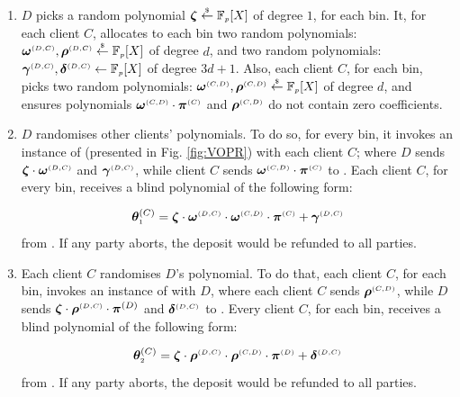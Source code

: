 \begin{enumerate}
\item\label{JUS::check-non-zero-coeff}  $D$ picks a  random polynomial $\bm\zeta \stackrel{\scriptscriptstyle\$}\leftarrow \mathbb{F}_{\scriptscriptstyle p}[X]$ of degree $1$, for each bin.  
It, for each client $C$, allocates to each bin two random polynomials: $\bm\omega^{\scriptscriptstyle(D,C)}, \bm\rho^{\scriptscriptstyle (D,C)}\stackrel{\scriptscriptstyle\$}\leftarrow \mathbb{F}_{\scriptscriptstyle p}[X]$ of degree $d$, and  two  random polynomials: $\bm\gamma^{\scriptscriptstyle (D,C)}, \bm\delta^{\scriptscriptstyle (D,C)} \leftarrow \mathbb{F}_{\scriptscriptstyle p}[X]$ of degree $3d+1$. Also, each client $C$, for each bin, picks two  random polynomials: $\bm\omega^{\scriptscriptstyle (C,D)}, \bm\rho^{\scriptscriptstyle (C,D)}\stackrel{\scriptscriptstyle\$}\leftarrow \mathbb{F}_{\scriptscriptstyle p}[X]$ of degree $d$, and ensures polynomials $\bm\omega^{\scriptscriptstyle (C,D)}\cdot \bm\pi^{\scriptscriptstyle  {  {(C)}}}$ and  $\bm\rho^{\scriptscriptstyle (C,D)}$ do not contain zero coefficients. %




\item\label{e-psi::D-randomises}  $D$ randomises other clients' polynomials. To do so, for every bin, it invokes an instance of {\vopr} (presented in Fig. \ref{fig:VOPR}) with  each client $  C$; where  $D$ sends $\bm\zeta \cdot \bm\omega^{\scriptscriptstyle  {  {(D,C)}}}$ and $\bm\gamma^{\scriptscriptstyle  {  {(D,C)}}}$, while client $ C$ sends $\bm\omega^{\scriptscriptstyle  {  {(C,D)}}}\cdot \bm\pi^{\scriptscriptstyle  {  {(C)}}}$ to {\vopr}. Each client $C$, for every bin, receives a blind polynomial of the following form: 

$$\bm\theta^{  {  {(C)}}}_{\scriptscriptstyle 1}=\bm\zeta \cdot \bm\omega^{\scriptscriptstyle  {  {(D,C)}}}\cdot \bm\omega^{\scriptscriptstyle  {  {(C,D)}}}\cdot \bm\pi^{\scriptscriptstyle  {  {(C)}}}+\bm\gamma^{\scriptscriptstyle  {  {(D,C)}}}$$
%
 from {\vopr}. If any party aborts, the deposit would be refunded to all parties.

\item\label{e-psi::C-randomises} Each client $    {  C}$ randomises  $ {D}$'s polynomial. To do that, each client $    {  C}$, for each bin,  invokes an instance of {\vopr} with   $ {D}$,    where each client $    {  C}$  sends $\bm\rho^{\scriptscriptstyle  {  {(C,D)}}}$, while  ${D}$  sends $\bm\zeta\cdot\bm \rho^{\scriptscriptstyle  {  {(D,C)}}}\cdot \bm\pi^{  {  {(D)}}}$ and $\bm\delta^{\scriptscriptstyle  {  {(D,C)}}}$ to {\vopr}. Every client   $    {  C}$, for each bin,  receives a blind polynomial of the following form: 

$$\bm\theta^{  {  {(C)}}}_{\scriptscriptstyle 2}=\bm\zeta \cdot \bm\rho^{\scriptscriptstyle  {  {(D,C)}}}\cdot \bm\rho^{\scriptscriptstyle  {  {(C,D)}}}\cdot \bm\pi^{\scriptscriptstyle  {  {(D)}}}+\bm\delta^{\scriptscriptstyle  {  {(D,C)}}}$$
 from {\vopr}. If any party aborts, the deposit would be refunded to all parties.



\end{enumerate}
